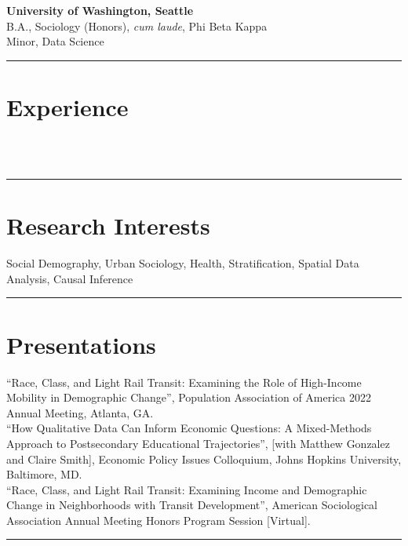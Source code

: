 \documentclass[11pt]{article} %
\begin{document}
 \smallskip
{} \textbf{University of Washington, Seattle} \\
\textsc{B.A.}, Sociology (Honors), \emph{cum laude}, Phi Beta Kappa \\
Minor, Data Science \\
\noindent\rule{16cm}{0.4pt}

\section*{Experience}

  \\
\\
\noindent\rule{16cm}{0.4pt}

\section*{Research Interests}

Social Demography, Urban Sociology, Health, Stratification, Spatial Data Analysis, Causal Inference \\
\noindent\rule{16cm}{0.4pt}
\section*{Presentations}

 “Race, Class, and Light Rail Transit: Examining the Role of High-Income Mobility in Demographic Change”, Population Association of America 2022 Annual Meeting, Atlanta, GA. \\
“How Qualitative Data Can Inform Economic Questions: A Mixed-Methods Approach to Postsecondary Educational Trajectories”, [with Matthew Gonzalez and Claire Smith], Economic Policy Issues Colloquium, Johns Hopkins University, Baltimore, MD. \\
 “Race, Class, and Light Rail Transit: Examining Income and Demographic Change in Neighborhoods with Transit Development”, American Sociological Association Annual Meeting Honors Program Session [Virtual]. \\
\noindent\rule{16cm}{0.4pt}
\end{document}
